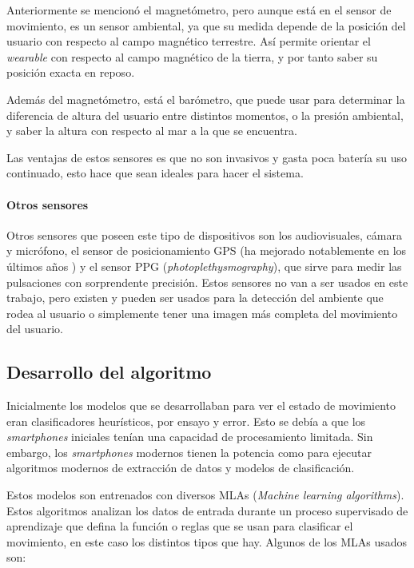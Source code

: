 \documentclass[12pt]{book}
\numberwithin{equation}{section}
\begin{document}
Anteriormente se mencionó el magnetómetro, pero aunque está en el sensor de movimiento, es un sensor ambiental, ya que su medida depende de la posición del usuario con respecto al campo magnético terrestre. Así permite orientar el \textit{wearable} con respecto al campo magnético de la tierra, y por tanto saber su posición exacta en reposo.

Además del magnetómetro, está el barómetro, que puede usar para determinar la diferencia de altura del usuario entre distintos momentos, o la presión ambiental, y saber la altura con respecto al mar a la que se encuentra.

Las ventajas de estos sensores es que no son invasivos y gasta poca batería su uso continuado, esto hace que sean ideales para hacer el sistema.

\paragraph{Otros sensores} Otros sensores que poseen este tipo de dispositivos son los audiovisuales, cámara y micrófono, el sensor de posicionamiento GPS (ha mejorado notablemente en los últimos años \cite{vonWatzdorf:2010:APD:1899662.1899664}) y el sensor PPG (\textit{photoplethysmography}), que sirve para medir las pulsaciones con sorprendente precisión\cite{7748986}\cite{77489867}. Estos sensores no van a ser usados en este trabajo, pero existen y pueden ser usados para la detección del ambiente que rodea al usuario\cite{Lu:2009:SSS:1555816.1555834} o simplemente tener una imagen más completa del movimiento del usuario\cite{doi:10.1155/2014/503291}.

\subsection{Desarrollo del algoritmo}
Inicialmente los modelos que se desarrollaban para ver el estado de movimiento eran clasificadores heurísticos, por ensayo y error. Esto se debía a que los \textit{smartphones} iniciales tenían una capacidad de procesamiento limitada. Sin embargo, los \textit{smartphones} modernos tienen la potencia como para ejecutar algoritmos modernos de extracción de datos y modelos de clasificación.

Estos modelos son entrenados con diversos MLAs (\textit{Machine learning algorithms}). Estos algoritmos analizan los datos de entrada durante un proceso supervisado de aprendizaje que defina la función o reglas que se usan para clasificar el movimiento, en este caso los distintos tipos que hay. Algunos de los MLAs usados son:
\end{document}

